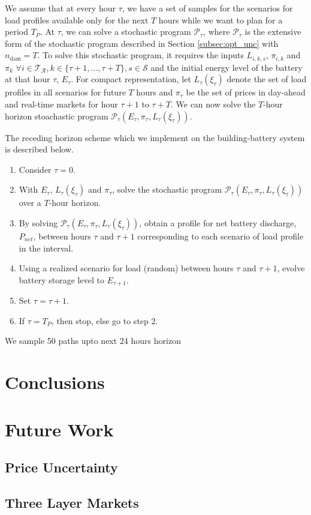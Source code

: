 \documentclass[11pt,twoside]{article}
\begin{document}
We assume that at every hour $\tau$, we have a set of samples for the scenarios for load profiles available only for the next $T$ hours while we want to plan for a period $T_{P}$. At $\tau$, we can solve a stochastic program $\mathcal{P}_{\tau}$, where $\mathcal{P}_{\tau}$ is the extensive form of the stochastic program described in Section \ref{subsec:opt_unc} with $n_\text{dam} = T$. To solve this stochastic program, it requires the inputs $L_{i,k,s}$, $\pi_{i,k}$ and $\pi_k$ $\forall i \in \mathcal{T_R}, k \in \{\tau+1, ..., \tau+T\}, s \in \mathcal{S}$ and the initial energy level of the battery at that hour $\tau$, $E_{\tau}$. For compact representation, let $L_{\tau}(\xi_{\tau})$ denote the set of load profiles in all scenarios for future $T$ hours and $\pi_{\tau}$ be the set of prices in day-ahead and real-time markets for hour $\tau+1$ to $\tau+T$. We can now solve the $T$-hour horizon stoachastic program $\mathcal{P}_{\tau}\left(E_{\tau}, \pi_{\tau}, L_{\tau}(\xi_{\tau})\right)$.

The receding horizon scheme which we implement on the building-battery system is described below.
\begin{enumerate}
\item Consider $\tau = 0$.
\item With $E_\tau$, $L_{\tau}(\xi_{\tau})$ and $\pi_{\tau}$, solve the stochastic program $\mathcal{P}_{\tau}\left(E_{\tau}, \pi_{\tau}, L_{\tau}(\xi_{\tau})\right)$ over a $T$-hour horizon.
\item By solving $\mathcal{P}_{\tau}\left(E_{\tau}, \pi_{\tau}, L_{\tau}(\xi_{\tau})\right)$, obtain a profile for net battery discharge, $P_{net}$, between hours $\tau$ and $\tau+1$ corresponding to each scenario of load profile in the interval.
\item Using a realized scenario for load (random) between hours $\tau$ and $\tau+1$, evolve battery storage level to $E_{\tau+1}$.
\item Set $\tau = \tau+1$.
\item If $\tau = T_P$, then stop, else go to step 2.
\end{enumerate}




We sample 50 paths upto next 24 hours horizon
\section{Conclusions}

\section{Future Work}

\subsection{Price Uncertainty}

\subsection{Three Layer Markets}




\end{document}
